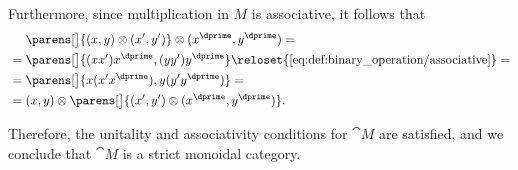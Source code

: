 \begin{example}
\begin{thmenum}
    Furthermore, since multiplication in \( M \) is associative, it follows that
    \begin{align*}
      &\phantom{{}={}}
      \parens[\big]{ (x, y) \otimes (x', y') } \otimes (x^\dprime, y^\dprime)
      = \\ &=
      \parens[\big]{ (xx')x^\dprime, (yy')y^\dprime }
      \reloset {\eqref{eq:def:binary_operation/associative}} = \\ &=
      \parens[\big]{ x(x'x^\dprime), y(y'y^\dprime) }
      = \\ &=
      (x, y) \otimes \parens[\big]{ (x', y') \otimes (x^\dprime, y^\dprime) }.
    \end{align*}

    Therefore, the unitality and associativity conditions for \( \cat{M} \) are satisfied, and we conclude that \( \cat{M} \) is a strict monoidal category.
  \end{thmenum}
\end{example}

